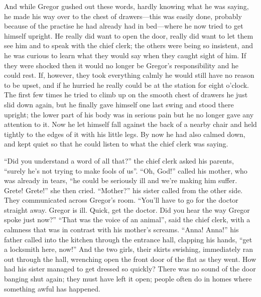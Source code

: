 And while Gregor gushed out these words, hardly knowing what he was
saying, he made his way over to the chest of drawers—this was easily
done, probably because of the practise he had already had in bed—where
he now tried to get himself upright. He really did want to open the
door, really did want to let them see him and to speak with the chief
clerk; the others were being so insistent, and he was curious to learn
what they would say when they caught sight of him. If they were shocked
then it would no longer be Gregor’s responsibility and he could rest.
If, however, they took everything calmly he would still have no reason
to be upset, and if he hurried he really could be at the station for
eight o’clock. The first few times he tried to climb up on the smooth
chest of drawers he just slid down again, but he finally gave himself
one last swing and stood there upright; the lower part of his body was
in serious pain but he no longer gave any attention to it. Now he let
himself fall against the back of a nearby chair and held tightly to the
edges of it with his little legs. By now he had also calmed down, and
kept quiet so that he could listen to what the chief clerk was saying.

“Did you understand a word of all that?” the chief clerk asked his
parents, “surely he’s not trying to make fools of us”. “Oh, God!”
called his mother, who was already in tears, “he could be seriously ill
and we’re making him suffer. Grete! Grete!” she then cried. “Mother?”
his sister called from the other side. They communicated across
Gregor’s room. “You’ll have to go for the doctor straight away. Gregor
is ill. Quick, get the doctor. Did you hear the way Gregor spoke just
now?” “That was the voice of an animal”, said the chief clerk, with a
calmness that was in contrast with his mother’s screams. “Anna! Anna!”
his father called into the kitchen through the entrance hall, clapping
his hands, “get a locksmith here, now!” And the two girls, their skirts
swishing, immediately ran out through the hall, wrenching open the
front door of the flat as they went. How had his sister managed to get
dressed so quickly? There was no sound of the door banging shut again;
they must have left it open; people often do in homes where something
awful has happened.

